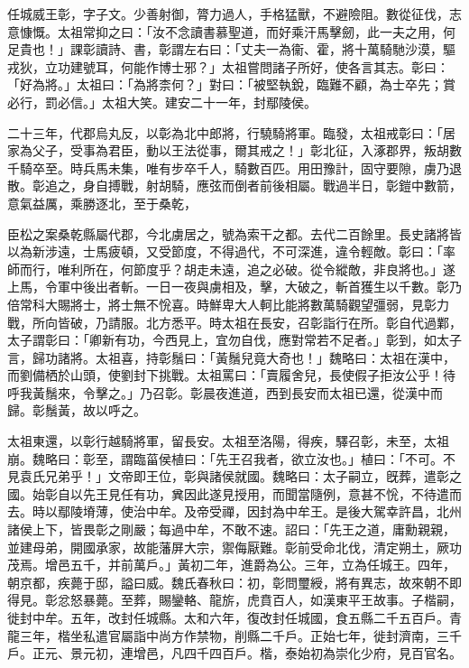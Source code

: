 
\begin{pinyinscope}
任城威王彰，字子文。少善射御，膂力過人，手格猛獸，不避險阻。數從征伐，志意慷慨。太祖常抑之曰：「汝不念讀書慕聖道，而好乘汗馬擊劒，此一夫之用，何足貴也！」課彰讀詩、書，彰謂左右曰：「丈夫一為衞、霍，將十萬騎馳沙漠，驅戎狄，立功建號耳，何能作博士邪？」太祖嘗問諸子所好，使各言其志。彰曰：「好為將。」太祖曰：「為將柰何？」對曰：「被堅執銳，臨難不顧，為士卒先；賞必行，罰必信。」太祖大笑。建安二十一年，封鄢陵侯。

二十三年，代郡烏丸反，以彰為北中郎將，行驍騎將軍。臨發，太祖戒彰曰：「居家為父子，受事為君臣，動以王法從事，爾其戒之！」彰北征，入涿郡界，叛胡數千騎卒至。時兵馬未集，唯有步卒千人，騎數百匹。用田豫計，固守要隙，虜乃退散。彰追之，身自搏戰，射胡騎，應弦而倒者前後相屬。戰過半日，彰鎧中數箭，意氣益厲，乘勝逐北，至于桑乾，

臣松之案桑乾縣屬代郡，今北虜居之，號為索干之都。去代二百餘里。長史諸將皆以為新涉遠，士馬疲頓，又受節度，不得過代，不可深進，違令輕敵。彰曰：「率師而行，唯利所在，何節度乎？胡走未遠，追之必破。從令縱敵，非良將也。」遂上馬，令軍中後出者斬。一日一夜與虜相及，擊，大破之，斬首獲生以千數。彰乃倍常科大賜將士，將士無不恱喜。時鮮卑大人軻比能將數萬騎觀望彊弱，見彰力戰，所向皆破，乃請服。北方悉平。時太祖在長安，召彰詣行在所。彰自代過鄴，太子謂彰曰：「卿新有功，今西見上，宜勿自伐，應對常若不足者。」彰到，如太子言，歸功諸將。太祖喜，持彰鬚曰：「黃鬚兒竟大奇也！」魏略曰：太祖在漢中，而劉備栖於山頭，使劉封下挑戰。太祖罵曰：「賣履舍兒，長使假子拒汝公乎！待呼我黃鬚來，令擊之。」乃召彰。彰晨夜進道，西到長安而太祖已還，從漢中而歸。彰鬚黃，故以呼之。

太祖東還，以彰行越騎將軍，留長安。太祖至洛陽，得疾，驛召彰，未至，太祖崩。魏略曰：彰至，謂臨菑侯植曰：「先王召我者，欲立汝也。」植曰：「不可。不見袁氏兄弟乎！」文帝即王位，彰與諸侯就國。魏略曰：太子嗣立，旣葬，遣彰之國。始彰自以先王見任有功，兾因此遂見授用，而聞當隨例，意甚不恱，不待遣而去。時以鄢陵塉薄，使治中牟。及帝受禪，因封為中牟王。是後大駕幸許昌，北州諸侯上下，皆畏彰之剛嚴；每過中牟，不敢不速。詔曰：「先王之道，庸勳親親，並建母弟，開國承家，故能藩屏大宗，禦侮厭難。彰前受命北伐，清定朔土，厥功茂焉。增邑五千，并前萬戶。」黃初二年，進爵為公。三年，立為任城王。四年，朝京都，疾薨于邸，謚曰威。魏氏春秋曰：初，彰問璽綬，將有異志，故來朝不即得見。彰忿怒暴薨。至葬，賜鑾輅、龍旂，虎賁百人，如漢東平王故事。子楷嗣，徙封中牟。五年，改封任城縣。太和六年，復改封任城國，食五縣二千五百戶。青龍三年，楷坐私遣官屬詣中尚方作禁物，削縣二千戶。正始七年，徙封濟南，三千戶。正元、景元初，連增邑，凡四千四百戶。楷，泰始初為崇化少府，見百官名。


\end{pinyinscope}